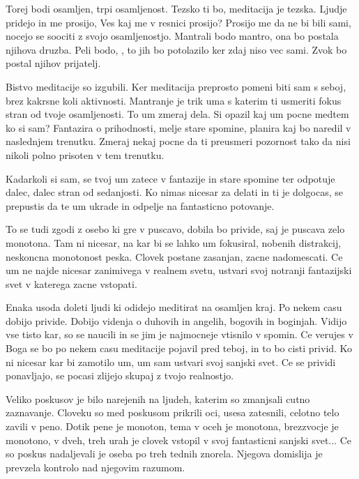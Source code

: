 Torej bodi osamljen, trpi osamljenost. Tezsko ti bo, meditacija je tezska. Ljudje pridejo in me prosijo,  Ves kaj me v resnici prosijo? Prosijo me da ne bi bili sami, nocejo se soociti z svojo osamljenostjo. Mantrali bodo mantro, ona bo postala njihova druzba. Peli bodo, , to jih bo potolazilo ker zdaj niso vec sami. Zvok  bo postal njihov prijatelj. 

Bistvo meditacije so izgubili. Ker meditacija preprosto pomeni biti sam s seboj, brez kakrsne koli aktivnosti. Mantranje je trik uma s katerim ti usmeriti fokus stran od tvoje osamljenosti. To um zmeraj dela. Si opazil kaj um pocne medtem ko si sam? Fantazira o prihodnosti, melje stare spomine, planira kaj bo naredil v naslednjem trenutku. Zmeraj nekaj pocne da ti preusmeri pozornost tako da nisi nikoli polno prisoten v tem trenutku. 

Kadarkoli si sam, se tvoj um zatece v fantazije in stare spomine ter odpotuje dalec, dalec stran od sedanjosti. Ko nimas nicesar za delati in ti je dolgocas, se prepustis da te um ukrade in odpelje na fantasticno potovanje. 

To se tudi zgodi z osebo ki gre v puscavo, dobila bo privide, saj je puscava zelo monotona. Tam ni nicesar, na kar bi se lahko um fokusiral, nobenih distrakcij, neskoncna monotonost peska. Clovek postane zasanjan, zacne nadomescati. Ce um ne najde nicesar zanimivega v realnem svetu, ustvari svoj notranji fantazijski svet v katerega zacne vstopati. 

Enaka usoda doleti ljudi ki odidejo meditirat na osamljen kraj. Po nekem casu dobijo privide. Dobijo videnja o duhovih in angelih, bogovih in boginjah. Vidijo vse tisto kar, so se naucili in se jim je najmocneje vtisnilo v spomin. Ce verujes v Boga se bo po nekem casu meditacije pojavil pred teboj, in to bo cisti privid. Ko ni nicesar kar bi zamotilo um, um sam ustvari svoj sanjski svet. Ce se prividi ponavljajo, se pocasi zlijejo skupaj z tvojo realnostjo. 

Veliko poskusov je bilo narejenih na ljudeh, katerim so zmanjsali cutno zaznavanje. Cloveku so med poskusom prikrili oci, usesa zatesnili, celotno telo zavili v peno. Dotik pene je monoton, tema v oceh je monotona, brezzvocje je monotono, v dveh, treh urah je clovek vstopil v svoj fantasticni sanjski svet... Ce so poskus nadaljevali je oseba po treh tednih znorela. Njegova domislija je prevzela kontrolo nad njegovim razumom. 

